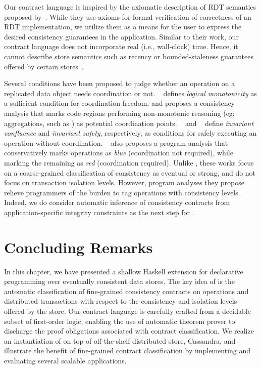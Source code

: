 Our contract language is inspired by the axiomatic description of RDT semantics
proposed by~\cite{Burckhardt2014}. While they use axioms for formal
verification of correctness of an RDT implementation, we utilize them as a
means for the user to express the desired consistency guarantees in the
application. Similar to their work, our contract language does not incorporate
real (i.e., wall-clock) time. Hence, it cannot describe store semantics such as
recency or bounded-staleness guarantees offered by certain
stores~\cite{Terry2013}.

Several conditions have been proposed to judge whether an operation on a
replicated data object needs coordination or not. ~\cite{Calm} defines
\emph{logical monotonicity} as a sufficient condition for coordination freedom,
and proposes a consistency analysis that marks code regions performing
non-monotonic reasoning (eg: aggregations, such as ) as potential
coordination points.  ~\cite{IConfluence} and ~\cite{Sieve} define
\emph{invariant confluence} and \emph{invariant safety}, respectively, as
conditions for safely executing an operation without coordination. ~\cite{Sieve}
also proposes a program analysis that conservatively marks operations as
\emph{blue} (coordination not required), while marking the remaining as
\emph{red} (coordination required). Unlike \quelea, these works focus on a
coarse-grained classification of consistency as eventual or strong, and do not
focus on transaction isolation levels. However, program analyses they propose
relieve programmers of the burden to tag operations with consistency levels.
Indeed, we do consider automatic inference of consistency contracts from
application-specific integrity constraints as the next step for \quelea.

\section{Concluding Remarks}
\label{q_sec:concl}

In this chapter, we have presented \quelea a shallow Haskell extension for
declarative programming over eventually consistent data stores. The key idea of
\quelea is the automatic classification of fine-grained consistency contracts on
operations and distributed transactions with respect to the consistency and
isolation levels offered by the store. Our contract language is carefully
crafted from a decidable subset of first-order logic, enabling the use of
automatic theorem prover to discharge the proof obligations associated with
contract classification. We realize an instantiation of \quelea on top of
off-the-shelf distributed store, Cassandra, and illustrate the benefit of
fine-grained contract classification by implementing and evaluating several
scalable applications.
